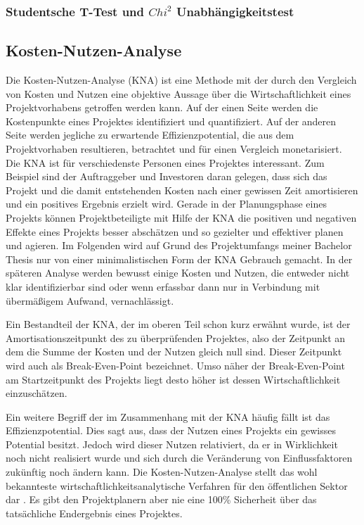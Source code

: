 \subsubsection{Studentsche T-Test und $Chi^2$ Unabhängigkeitstest}

\subsection{Kosten-Nutzen-Analyse}
Die Kosten-Nutzen-Analyse (KNA) ist eine Methode mit der durch den Vergleich von Kosten und Nutzen eine objektive Aussage über die Wirtschaftlichkeit eines Projektvorhabens getroffen werden kann. Auf der einen Seite werden die Kostenpunkte eines Projektes identifiziert und quantifiziert. Auf der anderen Seite werden jegliche zu erwartende Effizienzpotential, die aus dem Projektvorhaben resultieren, betrachtet und für einen Vergleich monetarisiert. Die KNA ist für verschiedenste Personen eines Projektes interessant. Zum Beispiel sind der Auftraggeber und Investoren daran gelegen, dass sich das Projekt und die damit entstehenden Kosten nach einer gewissen Zeit amortisieren und ein positives Ergebnis erzielt wird. Gerade in der Planungsphase eines Projekts können Projektbeteiligte mit Hilfe der KNA die positiven und negativen Effekte eines Projekts besser abschätzen und so gezielter und effektiver planen und agieren. Im Folgenden wird auf Grund des Projektumfangs meiner Bachelor Thesis nur von einer minimalistischen Form der KNA Gebrauch gemacht. In der späteren Analyse werden bewusst einige Kosten und Nutzen, die entweder nicht klar identifizierbar sind oder wenn erfassbar dann nur in Verbindung mit übermäßigem Aufwand, vernachlässigt. 

Ein Bestandteil der KNA, der im oberen Teil schon kurz erwähnt wurde, ist der Amortisationszeitpunkt des zu überprüfenden Projektes, also der Zeitpunkt an dem die Summe der Kosten und der Nutzen gleich null sind. Dieser Zeitpunkt wird auch als Break-Even-Point bezeichnet. Umso näher der Break-Even-Point am Startzeitpunkt des Projekts liegt desto höher ist dessen Wirtschaftlichkeit einzuschätzen.

Ein weitere Begriff der im Zusammenhang mit der KNA häufig fällt ist das Effizienzpotential. Dies sagt aus, dass der Nutzen eines Projekts ein gewisses Potential besitzt. Jedoch wird dieser Nutzen relativiert, da er in Wirklichkeit noch nicht realisiert wurde und sich durch die Veränderung von Einflussfaktoren zukünftig noch ändern kann. Die Kosten-Nutzen-Analyse \glqq [...] stellt das wohl bekannteste wirtschaftlichkeitsanalytische Verfahren für den öffentlichen Sektor dar\grqq{} \citep[1]{Hanusch2011}. Es gibt den Projektplanern aber nie eine 100\% Sicherheit über das tatsächliche Endergebnis eines Projektes.

